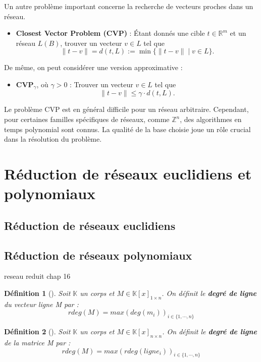 \documentclass[a4paper,12pt]{report}  %
\theoremstyle{definitionstyle}
\newtheorem{definition}{Définition}[chapter] %
\theoremstyle{examplestyle}
\theoremstyle{remarkstyle}
\theoremstyle{propositionstyle}
\begin{document}
	Un autre problème important concerne la recherche de vecteurs proches dans un réseau.
	
	\begin{itemize}
		\item \textbf{Closest Vector Problem (CVP)} : Étant donnés une cible $t \in \mathbb{R}^m$ et un réseau $L(B)$, trouver un vecteur $v \in L$ tel que 
		\[
		\|t - v\| = d(t, L) := \min \{ \|t - v\| \mid v \in L \}.
		\]
	\end{itemize}
	
	De même, on peut considérer une version approximative :
	
	\begin{itemize}
		\item \textbf{CVP$_\gamma$}, où $\gamma > 0$ : Trouver un vecteur $v \in L$ tel que 
		\[
		\|t - v\| \leq \gamma \cdot d(t, L).
		\]
	\end{itemize}
	
	Le problème CVP est en général difficile pour un réseau arbitraire. Cependant, pour certaines familles spécifiques de réseaux, comme $\mathbb{Z}^n$, des algorithmes en temps polynomial sont connus. La qualité de la base choisie joue un rôle crucial dans la résolution du problème.
		
	\section{Réduction de réseaux euclidiens et polynomiaux}
	
	\subsection{Réduction de réseaux euclidiens}
	
	\subsection{Réduction de réseaux polynomiaux}
	
	reseau reduit chap 16
	
	\begin{definition}[\cite{clef_unique_0}]
		Soit $\mathbb{K}$ un corps et $M \in \mathbb{K}[x]_{1 \times n}$. On définit le \textbf{degré de ligne} du vecteur ligne M par : 
		$$rdeg(M)=max(deg(m_i))_{i\in\{1, \cdots, n\}}$$
	\end{definition}
	
	\begin{definition}[\cite{clef_unique_0}]
		Soit $\mathbb{K}$ un corps et $M \in \mathbb{K}[x]_{n \times n}$. On définit le \textbf{degré de ligne} de la matrice M par :
		$$rdeg(M)=max(rdeg(ligne_i))_{i\in\{1, \cdots, n\}}$$
	\end{definition}
	
\end{document}
